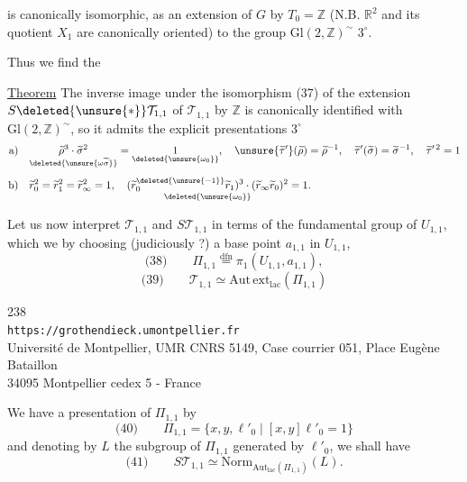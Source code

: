   is canonically isomorphic, as an extension of $G$ by $T_0=\mathbb Z$ (N.B. $\mathbb R^2$ and its quotient $X_1$ are canonically oriented) to the group $\mathrm{Gl}(2,\mathbb Z)^\sim$  $3^\circ$.

Thus we find   the

\uline{Theorem} The inverse image under the isomorphism (37) of the extension $S\deleted{\unsure{*}}\mathcal T_{1,1}$ of $\mathcal T_{1,1}$ by $\mathbb Z$ is canonically identified with $\mathrm{Gl}(2,\mathbb Z)^\sim$, so it admits the  explicit presentations  $3^\circ$
\[
\begin{aligned}
\text{a)}\quad &
\underset{\deleted{\unsure{\omega\widetilde\sigma}}}{\widetilde\rho^{3}\cdot\widetilde\sigma^{2}}
=\underset{\deleted{\unsure{\omega_0}}}{1},\quad
\unsure{\widetilde\tau'}(\widetilde\rho)=\widetilde\rho^{-1},\quad
\widetilde\tau'(\widetilde\sigma)=\widetilde\sigma^{-1},\quad
\widetilde\tau'^{\,2}=1
\\[1ex]
\text{b)}\quad &
\widetilde r_0^{2}=\widetilde r_1^{2}=\widetilde r_\infty^{2}=1,\quad
\underset{\deleted{\unsure{\omega_0}}}{
(\widetilde r_0^{\deleted{\unsure{-1}}}\widetilde r_1)^3\cdot
(\widetilde r_\infty\widetilde r_0)^2}=1.
\end{aligned}
\]

Let us now interpret $\mathcal T_{1,1}$ and $S\mathcal T_{1,1}$ in terms of the fundamental group of $U_{1,1}$, which we  by choosing (judiciously ?) a base point $a_{1,1}$ in $U_{1,1}$,
\[
\text{(38)}\qquad
\Pi_{1,1}\overset{\mathrm{dfn}}=\pi_1(U_{1,1},a_{1,1}),
\]
\[
\text{(39)}\qquad
\mathcal T_{1,1}\simeq\mathrm{Aut\,ext}_{\mathrm{lac}}(\Pi_{1,1})
\]

\begin{center}
238\\
\texttt{https://grothendieck.umontpellier.fr}\\
Université de Montpellier, UMR CNRS 5149, Case courrier 051, Place Eugène Bataillon\\
34095 Montpellier cedex 5 - France
\end{center}



We have a presentation of $\Pi_{1,1}$ by
\[
\text{(40)}\qquad
\Pi_{1,1}=\{x,y,\ell'_0\mid [x,y]\ell'_0=1\}
\]
and denoting by $L$ the subgroup of $\Pi_{1,1}$ generated by $\ell'_0$, we shall have
\[
\text{(41)}\qquad
S\mathcal T_{1,1}\simeq
\mathrm{Norm}_{\mathrm{Aut}_{\mathrm{lac}}(\Pi_{1,1})}(L).
\]

